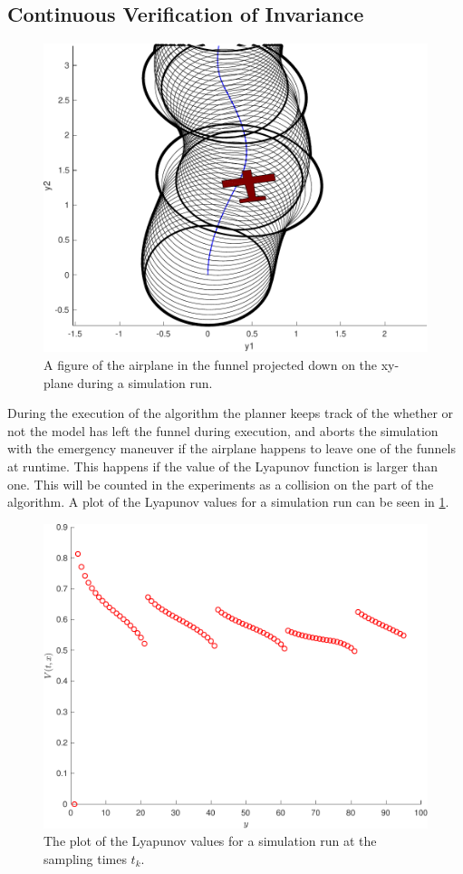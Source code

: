 \subsection{Continuous Verification of Invariance}
\label{subsec:check-vehicle-in-funnel}

\begin{figure}
  \centering
  \includegraphics[width=.8\textwidth]{figures/experiments/airplane-in-funnel} \caption{A
    figure of the airplane in the funnel projected down on the xy-plane during a
    simulation run.}
\end{figure}

During the execution of the \rrtfunnel{} algorithm the planner keeps track of
the whether or not the model has left the funnel during execution, and aborts
the simulation with the emergency maneuver if the airplane happens to leave one
of the funnels at runtime. This happens if the value of the Lyapunov function is
larger than one. This will be counted in the experiments as a collision on the
part of the \rrtfunnel{} algorithm. A plot of the Lyapunov values for a
simulation run can be seen in \cref{fig:lyapunov-values}.

\begin{figure}
  \centering
  \includegraphics[width=.8\textwidth]{figures/experiments/lyapunov-values-simulation-run}
  \caption{The plot of the Lyapunov values for a simulation run at the sampling
    times \(t_k\).}
  \label{fig:lyapunov-values}
\end{figure}

